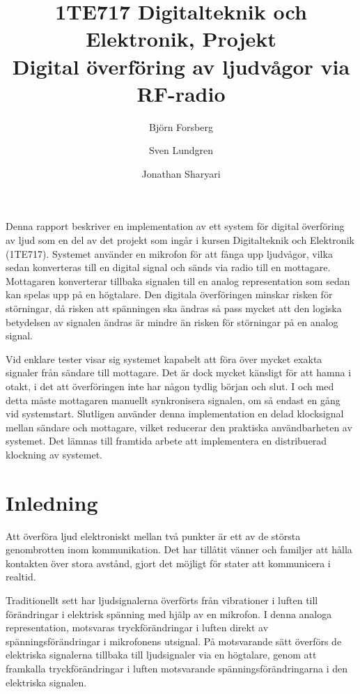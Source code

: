 \documentclass[a4paper,10pt]{article}
\title{{\small 1TE717 Digitalteknik och Elektronik, Projekt} \\ \textbf{Digital överföring av ljudvågor via RF-radio}}
\author{Bj{\"o}rn Forsberg \and Sven Lundgren \and Jonathan Sharyari}
\begin{document}
\maketitle

\abstract

Denna rapport beskriver en implementation av ett system för digital 
överföring av ljud som en del av det projekt som ingår i kursen Digitalteknik 
och Elektronik (1TE717). Systemet använder en mikrofon för att fånga upp 
ljudvågor, vilka sedan konverteras till en digital signal och sänds via radio 
till en mottagare. Mottagaren konverterar tillbaka signalen till en analog 
representation som sedan kan spelas upp på en högtalare. Den digitala 
överföringen minskar risken för störningar, då risken att spänningen ska ändras
så pass mycket att den logiska betydelsen av signalen ändras är mindre än risken 
för störningar på en analog signal.

Vid enklare tester visar sig systemet kapabelt att föra över mycket exakta 
signaler från sändare till mottagare. Det är dock mycket känsligt för att hamna
i otakt, i det att överföringen inte har någon tydlig början och slut. I och med
detta måste mottagaren manuellt synkronisera signalen, om så endast en gång vid 
systemstart. Slutligen använder denna implementation en delad klocksignal mellan 
sändare och mottagare, vilket reducerar den praktiska användbarheten av 
systemet. Det lämnas till framtida arbete att implementera en distribuerad 
klockning av systemet.

\section{Inledning}

Att överföra ljud elektroniskt mellan två punkter är ett av de största 
genombrotten inom kommunikation. Det har tillåtit vänner och familjer  att hålla 
kontakten över stora avstånd, gjort det möjligt för stater att kommunicera i 
realtid.

Traditionellt sett har ljudsignalerna överförts från vibrationer i luften till
förändringar i elektrisk spänning med hjälp av en mikrofon. I denna analoga 
representation, motsvaras tryckförändringar i luften direkt av 
spänningsförändringar i mikrofonens utsignal. På motsvarande sätt överförs de
elektriska signalerna tillbaka till ljudsignaler via en högtalare, genom att 
framkalla tryckförändringar i luften motsvarande spänningsförändringarna i
den elektriska signalen.
\end{document}
